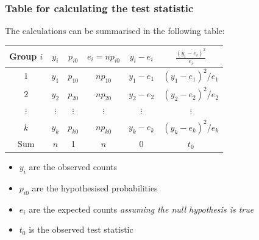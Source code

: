 \documentclass[a4paper]{article}
\begin{document}
\subsubsection{Table for calculating the test statistic}
The calculations can be summarised in the following table:
\begin{table}[H]
	\centering
	\begin{tabular}{@{}c|ccccc@{}}
	Group \( i \) & \( y_i \)  	 & \( p_{i0} \) & \( e_i = np_{i0} \) & \( y_i - e_i \) & \( \frac{(y_i - e_i)^2}{e_i} \) \\ \midrule
	\( 1 \) 	  & \( y_1 \)  	 & \( p_{10} \) & \( np_{10} \)       & \( y_1 - e_1 \) & \( (y_1 - e_1)^2/e_1 \) \\
	\( 2 \)   	  & \( y_2 \)  	 & \( p_{20} \) & \( np_{20} \)	  	  & \( y_2 - e_2 \) & \( (y_2 - e_2)^2/e_2 \) \\
	\( \vdots \)  & \( \vdots \) & \( \vdots \) & \( \vdots \) 	  	  & \( \vdots \) 	& \( \vdots \) 					  \\
	\( k \)   	  & \( y_k \) 	 & \( p_{k0} \)	& \( np_{k0} \) 	  & \( y_k - e_k \) & \( (y_k - e_k)^2/e_k \) \\ \midrule
	Sum 		  & \( n \) 	 & 1 			& \( n \) 			  & 0 				& \( t_0 \) 
	\end{tabular}
\end{table}
\begin{itemize}
	\item \( y_i \) are the observed counts
	\item \( p_{i0} \) are the hypothesised probabilities
	\item \( e_i \) are the expected counts \textit{assuming the null hypothesis is true}
	\item \( t_0 \) is the observed test statistic
\end{itemize}
\end{document}
